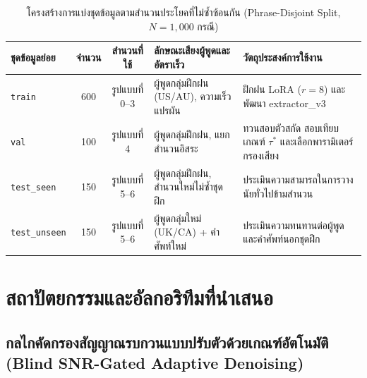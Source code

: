 \begin{table}[H]
\centering
\caption{โครงสร้างการแบ่งชุดข้อมูลตามสำนวนประโยคที่ไม่ซ้ำซ้อนกัน (Phrase-Disjoint Split, $N = 1{,}000$ กรณี)}
\label{tab:dataset}
\small
\begin{tabular}{|l|c|c|p{4.2cm}|p{3.8cm}|}
\hline
\textbf{ชุดข้อมูลย่อย} & \textbf{จำนวน} & \textbf{สำนวนที่ใช้} & \textbf{ลักษณะเสียงผู้พูดและอัตราเร็ว} & \textbf{วัตถุประสงค์การใช้งาน} \\
\hline
\texttt{train} & 600 & รูปแบบที่ 0--3 & ผู้พูดกลุ่มฝึกฝน (US/AU), ความเร็วแปรผัน & ฝึกฝน LoRA ($r=8$) และพัฒนา {extractor\_v3} \\
\hline
\texttt{val} & 100 & รูปแบบที่ 4 & ผู้พูดกลุ่มฝึกฝน, แยกสำนวนอิสระ & ทวนสอบตัวสกัด สอบเทียบเกณฑ์ $\tau^*$ และเลือกพารามิเตอร์กรองเสียง \\
\hline
\texttt{test\_seen} & 150 & รูปแบบที่ 5--6 & ผู้พูดกลุ่มฝึกฝน, สำนวนใหม่ไม่ซ้ำชุดฝึก & ประเมินความสามารถในการวางนัยทั่วไปข้ามสำนวน \\
\hline
\texttt{test\_unseen} & 150 & รูปแบบที่ 5--6 & ผู้พูดกลุ่มใหม่ (UK/CA) + คำศัพท์ใหม่ & ประเมินความทนทานต่อผู้พูดและคำศัพท์นอกชุดฝึก \\
\hline
\end{tabular}
\end{table}

\section{สถาปัตยกรรมและอัลกอริทึมที่นำเสนอ}

\subsection{กลไกคัดกรองสัญญาณรบกวนแบบปรับตัวด้วยเกณฑ์อัตโนมัติ (Blind SNR-Gated Adaptive Denoising)}

